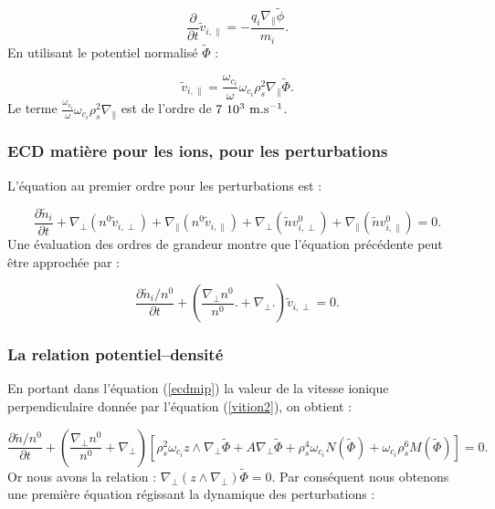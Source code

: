 \documentclass{book}
\begin{document}
\begin{equation}
\frac{\partial}{\partial t}\tilde{v}_{i,\parallel}
=-\frac{q_i\nabla_\parallel \tilde\phi}{m_i}.
\end{equation}
En utilisant le potentiel normalis\'e $\tilde\Phi$ :


\begin{equation}
\tilde{v}_{i,\parallel}=
\frac{\omega_{c_i}}{\omega}\omega_{c_i}\rho_s^2\nabla_\parallel\tilde\Phi.
\end{equation}
Le terme
$\frac{\omega_{c_i}}{\omega}\omega_{c_i}\rho_s^2\nabla_\parallel$ est
de l'ordre de $7\ 10^3\ {\rm m.s}^{-1}$.

\subsubsection{ECD mati\`ere pour les ions, pour les perturbations}

L'\'equation au premier ordre pour les perturbations est :

\begin{equation}
\frac{\partial \tilde{n}_i}{\partial t}
+\nabla_\perp(n^0\tilde{v}_{i,\perp})
+\nabla_\parallel(n^0\tilde v_{i,\parallel})
+\nabla_\perp(\tilde n v^0_{i,\perp})
+\nabla_\parallel(\tilde n v^0_{i,\parallel})=0.
\end{equation}
Une \'evaluation des ordres de grandeur montre que l'\'equation
pr\'ec\'edente peut \^etre approch\'ee par :

\begin{equation}\label{ecdmip}
\frac{\partial \tilde{n}_i/n^0}{\partial t}
+(\frac{\nabla_\perp n^0}{n^0}.+\nabla_\perp.)\tilde{v}_{i,\perp}=0.
\end{equation}


\subsubsection{La relation potentiel--densit\'e}

En portant dans l'\'equation (\ref{ecdmip}) la valeur de la vitesse
ionique perpendiculaire donn\'ee 
par l'\'equation (\ref{vition2}), on obtient :

\begin{equation}
\frac{\partial \tilde n/n^0}{\partial t}
+(\frac{\nabla_\perp n^0}{n^0} + \nabla_\perp)
[\rho_s^2\omega_{c_i}z\wedge\nabla_\perp\tilde\Phi
+A\nabla_\perp\tilde\Phi
+\rho_s^4\omega_{c_i}N(\tilde{\Phi})+\omega_{c_i}\rho_s^6M(\tilde\Phi)]=0.
\end{equation}
Or nous avons la relation : $\nabla_\perp(z\wedge
\nabla_\perp)\tilde\Phi=0$. 
Par cons\'equent nous obtenons une premi\`ere \'equation r\'egissant
la dynamique des 
perturbations :
\end{document}
